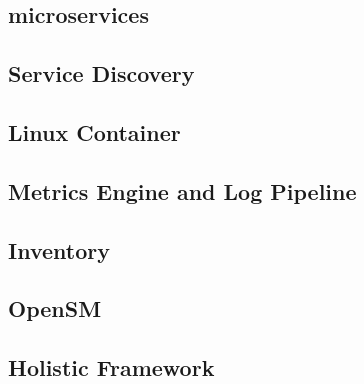 \subsection{microservices}



\subsection{Service Discovery}


\subsection{Linux Container}


\subsection{Metrics Engine and Log Pipeline}




\subsection{Inventory}


\subsection{OpenSM}


\subsection{Holistic Framework}

